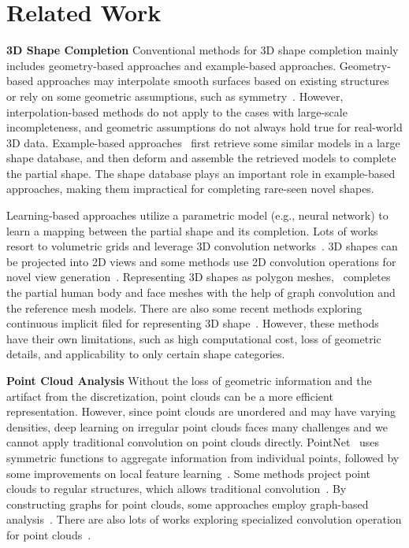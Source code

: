 \documentclass[letterpaper]{article} \usepackage{aaai20}  \usepackage{times}  \usepackage{helvet} \usepackage{courier}  \usepackage[hyphens]{url}  \usepackage{graphicx} \urlstyle{rm} \def\UrlFont{\rm}  \usepackage{graphicx}  \frenchspacing  \setlength{\pdfpagewidth}{8.5in}  \setlength{\pdfpageheight}{11in}  \usepackage{amsmath}
\begin{document}
\section{Related Work}


\textbf{3D Shape Completion} Conventional methods for 3D shape completion mainly includes geometry-based approaches and example-based approaches. Geometry-based approaches may interpolate smooth surfaces based on existing structures~\cite{davis2002filling,zhao2007robust} or rely on some geometric assumptions, such as symmetry~\cite{thrun2005shape,sipiran2014approximate}. However, interpolation-based methods do not apply to the cases with large-scale incompleteness, and geometric assumptions do not always hold true for real-world 3D data. Example-based approaches~\cite{pauly2005example,sung2015data,shen2012structure} first retrieve some similar models in a large shape database, and then deform and assemble the retrieved models to complete the partial shape. The shape database plays an important role in example-based approaches, making them impractical for completing rare-seen novel shapes.

Learning-based approaches utilize a parametric model (e.g., neural network) to learn a mapping between the partial shape and its completion. Lots of works resort to volumetric grids and leverage 3D convolution networks~\cite{dai2017shape,han2017high,Stutz2018}. 3D shapes can be projected into 2D views and some methods use 2D convolution operations for novel view generation~\cite{tatarchenko2016multi,park2017transformation}. Representing 3D shapes as polygon meshes,~\citeauthor{litany2018deformable} completes the partial human body and face meshes with the help of graph convolution and the reference mesh models. There are also some recent methods exploring continuous implicit filed for representing 3D shape~\cite{chen2018learning,park2019deepsdf}. However, these methods have their own limitations, such as high computational cost, loss of geometric details, and applicability to only certain shape categories.

\textbf{Point Cloud Analysis} Without the loss of geometric information and the artifact from the discretization, point clouds can be a more efficient representation. However, since point clouds are unordered and may have varying densities, deep learning on irregular point clouds faces many challenges and we cannot apply traditional convolution on point clouds directly. PointNet~\cite{qi2017pointnet} uses symmetric functions to aggregate information from individual points, followed by some improvements on local feature learning~\cite{qi2017pointnet++,shen2018mining}. Some methods project point clouds to regular structures, which allows traditional convolution~\cite{su2018splatnet,tatarchenko2018tangent}. By constructing graphs for point clouds, some approaches employ graph-based analysis~\cite{hu2018semantic,landrieu2018large,wang2018dynamic}. There are also lots of works exploring specialized convolution operation for point clouds~\cite{jiang2018pointsift,li2018pointcnn,liu2019relation}.
\end{document}
